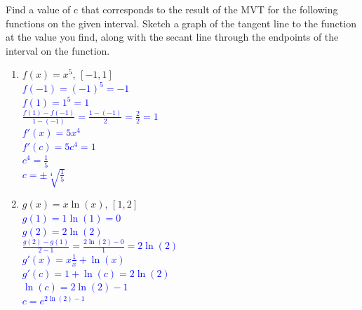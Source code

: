 \documentclass{ximera}
\begin{document}
\begin{exercise}
    Find a value of c that corresponds to the result of the MVT for the following functions on the given interval.  Sketch a graph of the tangent line to the function at the value you find, along with the secant line through the endpoints of the interval on the function.
   \begin{enumerate}
       \item $f(x)=x^5$, $[-1,1]$\\
       \textcolor{blue}{$f(-1)=(-1)^5=-1$\\
        $f(1)=1^5=1$\\
        $\frac{f(1)-f(-1)}{1-(-1)}=\frac{1-(-1)}{2}=\frac22=1$\\
        $f'(x)=5x^4$\\
        $f'(c)=5c^4=1$\\
        $c^4=\frac15$\\
        $c=\pm\sqrt[4]{\frac15}$}
       \item $g(x)=x\ln(x)$, $[1,2]$\\
       \textcolor{blue}{$g(1)=1\ln(1)=0$\\
        $g(2)=2\ln(2)$\\
        $\frac{g(2)-g(1)}{2-1}=\frac{2\ln(2)-0}{1}=2\ln(2)$\\
        $g'(x)=x\frac{1}{x}+\ln(x)$\\
        $g'(c)=1+\ln(c)=2\ln(2)$\\
        $\ln(c)=2\ln(2)-1$\\
        $c=e^{2\ln(2)-1}$}
   \end{enumerate}
\end{exercise}
\end{document}
